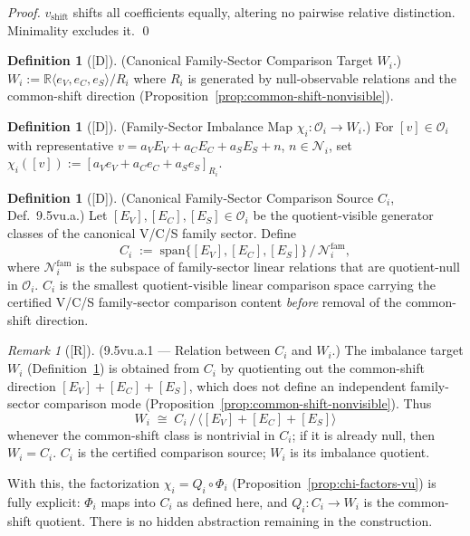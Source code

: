 \documentclass[12pt,oneside]{amsbook}
\theoremstyle{plain}
\theoremstyle{definition}
\newtheorem{definition}[theorem]{Definition}
\theoremstyle{remark}
\newtheorem{remark}[theorem]{Remark}
\newcommand{\status}[1]{\textup{[#1]}}
\begin{document}
\begin{proof}
$v_{\mathrm{shift}}$ shifts all coefficients equally, altering no
pairwise relative distinction.  Minimality excludes it. \qed
\end{proof}

\begin{definition}[\status{D}]\label{constr:comparison-target}
\textup{(Canonical Family-Sector Comparison Target $W_i$.)}
$W_i := \mathbb{R}\langle e_V,e_C,e_S\rangle / R_i$
where $R_i$ is generated by null-observable relations and the
common-shift direction (Proposition~\ref{prop:common-shift-nonvisible}).
\end{definition}

\begin{definition}[\status{D}]\label{def:imbalance-map}
\textup{(Family-Sector Imbalance Map $\chi_i : \mathcal{O}_i \to W_i$.)}
For $[v] \in \mathcal{O}_i$ with representative
$v = a_V E_V + a_C E_C + a_S E_S + n$, $n \in \mathcal{N}_i$, set
$\chi_i([v]) := [a_V e_V + a_C e_C + a_S e_S]_{R_i}$.
\end{definition}

\begin{definition}[\status{D}]\label{def:comparison-source}
\textup{(Canonical Family-Sector Comparison Source $C_i$, Def.~9.5vu.a.)}
Let $[E_V],[E_C],[E_S] \in \mathcal{O}_i$ be the quotient-visible
generator classes of the canonical V/C/S family sector.  Define
\[
  C_i \;:=\; \mathrm{span}\{[E_V],[E_C],[E_S]\}\,\big/\,\mathcal{N}_i^{\mathrm{fam}},
\]
where $\mathcal{N}_i^{\mathrm{fam}}$ is the subspace of family-sector
linear relations that are quotient-null in $\mathcal{O}_i$.
$C_i$ is the smallest quotient-visible linear comparison space
carrying the certified V/C/S family-sector comparison content
\emph{before} removal of the common-shift direction.
\end{definition}

\begin{remark}[\status{R}]\label{rem:Ci-Wi-relation}
\textup{(9.5vu.a.1 --- Relation between $C_i$ and $W_i$.)}
The imbalance target $W_i$ (Definition~\ref{constr:comparison-target})
is obtained from $C_i$ by quotienting out the common-shift direction
$[E_V]+[E_C]+[E_S]$, which does not define an independent
family-sector comparison mode
(Proposition~\ref{prop:common-shift-nonvisible}).  Thus
\[
  W_i \;\cong\; C_i\,\big/\,\langle[E_V]+[E_C]+[E_S]\rangle
\]
whenever the common-shift class is nontrivial in $C_i$; if it is
already null, then $W_i = C_i$.  $C_i$ is the certified comparison
source; $W_i$ is its imbalance quotient.

With this, the factorization $\chi_i = Q_i \circ \Phi_i$
(Proposition~\ref{prop:chi-factors-vu}) is fully explicit: $\Phi_i$
maps into $C_i$ as defined here, and $Q_i : C_i \to W_i$ is the
common-shift quotient.  There is no hidden abstraction remaining in
the construction.
\end{remark}
\end{document}
